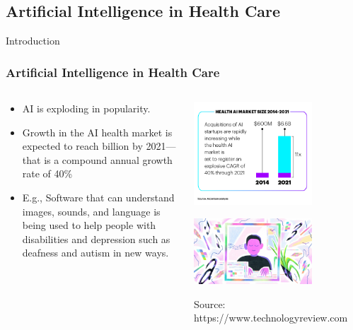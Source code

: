 \documentclass{beamer}
\begin{document}
\subsection{Artificial Intelligence in Health Care}
\begin{frame}{Introduction}

\frametitle{Artificial Intelligence in Health Care}

\begin{columns}
	\begin{column}{0.5\textwidth}
		\begin{itemize}
			\item  AI is exploding in popularity.
			\item  Growth in the AI health market is expected to reach 	 billion by 2021—that is a compound annual growth rate of 40\%
			\item E.g.,	Software that can understand images, sounds, and language is being used to help people with disabilities and depression such as deafness and autism in new ways.
		\end{itemize}

	\end{column}
	\begin{column}{0.5\textwidth}  %
		\begin{center}
			\includegraphics[width=0.7\textwidth]{AI.png}
		\end{center}
		\begin{center}
		\includegraphics[width=0.7\textwidth]{MLL.jpg}
	\end{center}
{\tiny 	Source: https://www.technologyreview.com}
	\end{column}
\end{columns}
\end{frame}
\end{document}
